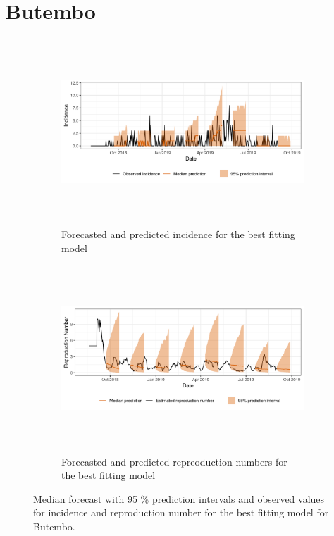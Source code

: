  \section{ Butembo }\begin{figure}[H]\begin{subfigure}{\textwidth}  \centering  \includegraphics[width=0.9\linewidth, height=7cm]{../output/Butembo_predictions.png}  \caption{Forecasted and predicted incidence for the best fitting model}\end{subfigure}

\begin{subfigure}{\textwidth}  \centering  \includegraphics[width=0.9\linewidth, height=7cm]{../output/Butembo_Rs.png}  \caption{Forecasted and predicted repreoduction numbers for the best fitting model}\end{subfigure}  \caption{Median forecast with 95 \% prediction intervals and observed values for incidence and reproduction number for the best fitting model for Butembo.}\end{figure}

